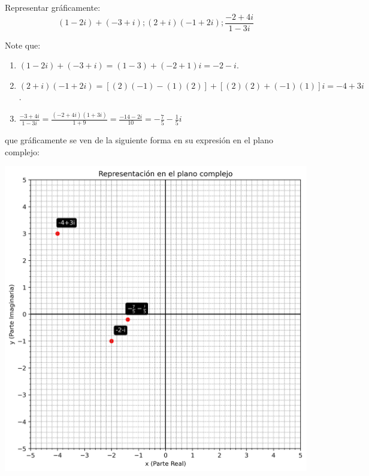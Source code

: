 \begin{homeworkProblem}
  Representar gráficamente:
  $$(1-2i)+(-3+i);(2+i)(-1+2i);\frac{-2+4i}{1-3i}$$
  \begin{solution}
    Note que:
    \begin{enumerate}
      \item $(1-2i)+(-3+i)=(1-3)+(-2+1)i=-2-i$.
      \item $(2+i)(-1+2i)=[(2)(-1)-(1)(2)]+[(2)(2)+(-1)(1)]i=-4+3i$.
      \item $\frac{-3+4i}{1-3i}=\frac{(-2+4i)(1+3i)}{1+9}=\frac{-14-2i}{10}=-\frac{7}{5}-\frac{1}{5}i$
    \end{enumerate}
    que gráficamente se ven de la siguiente forma en su expresión en el plano complejo:
    \begin{center}
      \includegraphics[scale=0.5]{images/grafico_punto_1.png}    
    \end{center}
  \end{solution}
\end{homeworkProblem}
